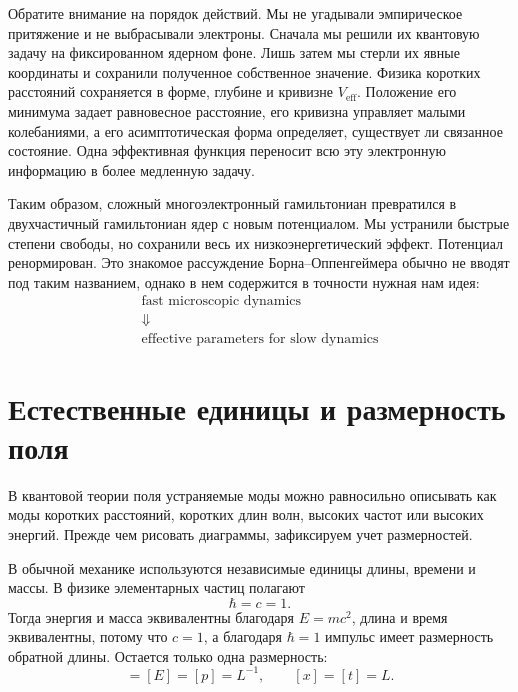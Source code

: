 Обратите внимание на порядок действий. Мы не угадывали эмпирическое притяжение и не выбрасывали электроны. Сначала мы решили их квантовую задачу на фиксированном ядерном фоне. Лишь затем мы стерли их явные координаты и сохранили полученное собственное значение. Физика коротких расстояний сохраняется в форме, глубине и кривизне \(V_{\mathrm{eff}}\). Положение его минимума задает равновесное расстояние, его кривизна управляет малыми колебаниями, а его асимптотическая форма определяет, существует ли связанное состояние. Одна эффективная функция переносит всю эту электронную информацию в более медленную задачу.

Таким образом, сложный многоэлектронный гамильтониан превратился в двухчастичный гамильтониан ядер с новым потенциалом. Мы устранили быстрые степени свободы, но сохранили весь их низкоэнергетический эффект. Потенциал ренормирован. Это знакомое рассуждение Борна--Оппенгеймера обычно не вводят под таким названием, однако в нем содержится в точности нужная нам идея:
\begin{equation}
\begin{gathered}
\text{fast microscopic dynamics}\\
\Downarrow\\
\text{effective parameters for slow dynamics}
\end{gathered}
\end{equation}

\section{Естественные единицы и размерность поля}

В квантовой теории поля устраняемые моды можно равносильно описывать как моды коротких расстояний, коротких длин волн, высоких частот или высоких энергий. Прежде чем рисовать диаграммы, зафиксируем учет размерностей.

В обычной механике используются независимые единицы длины, времени и массы. В физике элементарных частиц полагают
\begin{equation}
\hbar=c=1.
\end{equation}
Тогда энергия и масса эквивалентны благодаря \(E=mc^2\), длина и время эквивалентны, потому что \(c=1\), а благодаря \(\hbar=1\) импульс имеет размерность обратной длины. Остается только одна размерность:
\begin{equation}
[M]=[E]=[p]=L^{-1},
\qquad
[x]=[t]=L.
\label{eq:natural-units}
\end{equation}

